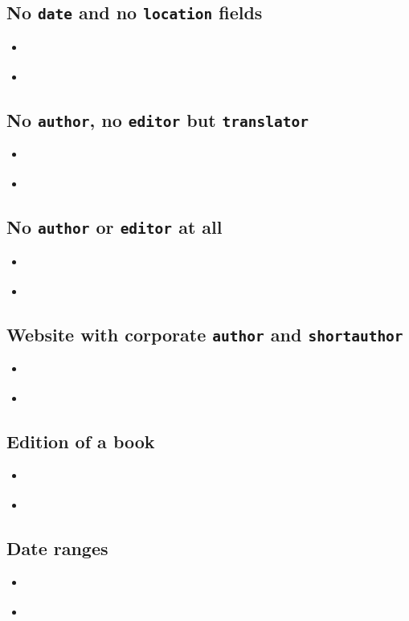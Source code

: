 \documentclass[a4paper,12pt]{scrartcl}
\newcommand{\Feld}[1]{\texttt{#1}}
\begin{document}
\subsection{No \Feld{date} and no \Feld{location} fields}
\begin{itemize}
	\item\cite{fuchs:o:j}%
	\item{}%
\end{itemize}

\subsection{No \Feld{author}, no \Feld{editor} but \Feld{translator}}
\begin{itemize}
	\item\cite{sterk:1777}%
	\item{}%
\end{itemize}

\subsection{No \Feld{author} or \Feld{editor} at all}
\begin{itemize}
	\item\cite{domino:1780}%
	\item{}%
\end{itemize}

\subsection{Website with corporate \Feld{author} and \Feld{shortauthor}}
\begin{itemize}
	\item\cite{kenmore}%
	\item{}%
\end{itemize}

\subsection{Edition of a book}
\begin{itemize}
	\item\cite{fuchs:kh:et:al:1998}%
	\item{}%
\end{itemize}

\subsection{Date ranges}
\begin{itemize}
	\item\cite{bhattacharyya:1973}%
	\item{}%
\end{itemize}
\end{document}

